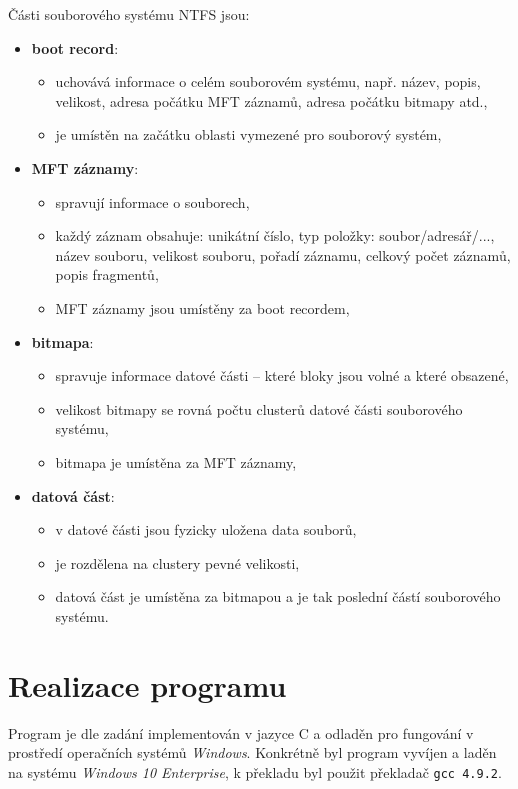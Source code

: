 \documentclass[
11pt,
a4paper,
pdftex,
czech,
titlepage
]{report}
\begin{document}
\noindent Části souborového systému NTFS jsou:
\begin{itemize}
\item \textbf{boot record}:
	\begin{itemize}
	\item uchovává informace o celém souborovém systému, např. název, popis, velikost, adresa počátku MFT záznamů, adresa počátku bitmapy atd.,
	\item je umístěn na začátku oblasti vymezené pro souborový systém,
	\end{itemize}
\item \textbf{MFT záznamy}:
	\begin{itemize}
	\item spravují informace o souborech,
	\item každý záznam obsahuje: unikátní číslo, typ položky: soubor/adresář/..., název souboru, velikost souboru, pořadí záznamu, celkový počet záznamů, popis fragmentů,
	\item MFT záznamy jsou umístěny za boot recordem,
	\end{itemize}
\item \textbf{bitmapa}:
	\begin{itemize}
	\item spravuje informace datové části -- které bloky jsou volné a které obsazené,
	\item velikost bitmapy se rovná počtu clusterů datové části souborového systému,
	\item bitmapa je umístěna za MFT záznamy,
	\end{itemize}
\item \textbf{datová část}:
	\begin{itemize}
	\item v datové části jsou fyzicky uložena data souborů,
	\item je rozdělena na clustery pevné velikosti,
	\item datová část je umístěna za bitmapou a je tak poslední částí souborového systému.
	\end{itemize}
\end{itemize}

\section{Realizace programu}
Program je dle zadání implementován v jazyce C a odladěn pro fungování v prostředí operačních systémů \textit{Windows}. Konkrétně byl program vyvíjen a laděn na systému \textit{Windows 10 Enterprise}, k překladu byl použit překladač \texttt{gcc 4.9.2}.
\end{document}
